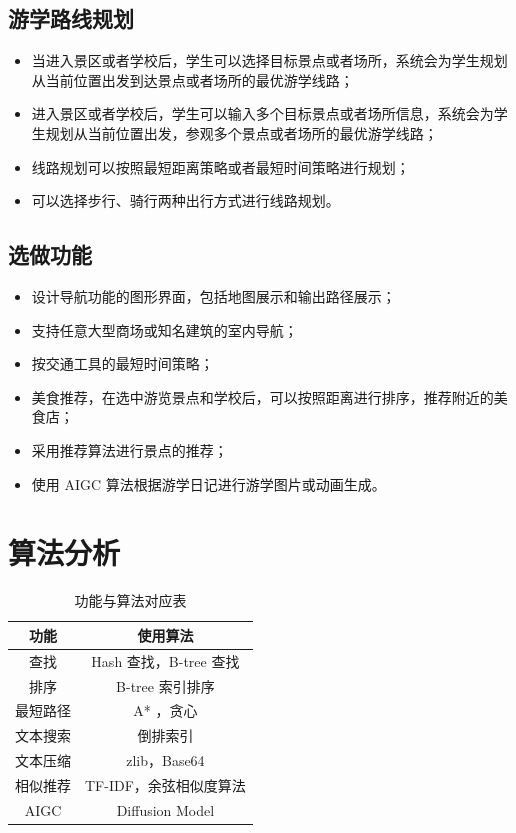 \documentclass{ctexart}
\begin{document}
\subsection{游学路线规划}

\begin{itemize}
    \item 当进入景区或者学校后，学生可以选择目标景点或者场所，系统会为学生规划从当前位置出发到达景点或者场所的最优游学线路；
    \item 进入景区或者学校后，学生可以输入多个目标景点或者场所信息，系统会为学生规划从当前位置出发，参观多个景点或者场所的最优游学线路；
    \item 线路规划可以按照最短距离策略或者最短时间策略进行规划；
    \item 可以选择步行、骑行两种出行方式进行线路规划。
\end{itemize}

\subsection{选做功能}

\begin{itemize}
    \item 设计导航功能的图形界面，包括地图展示和输出路径展示；
    \item 支持任意大型商场或知名建筑的室内导航；
    \item 按交通工具的最短时间策略；
    \item 美食推荐，在选中游览景点和学校后，可以按照距离进行排序，推荐附近的美食店；
    \item 采用推荐算法进行景点的推荐；
    \item 使用 AIGC 算法根据游学日记进行游学图片或动画生成。
\end{itemize}

\section{算法分析}

\begin{table}[htbp]
    \centering
    \caption{功能与算法对应表}
    \label{tab:my-table}
    \begin{tabular}{@{}cc@{}}
        \toprule
        \textbf{功能} & \textbf{使用算法}     \\ \midrule
        查找          & Hash 查找，B-tree 查找 \\
        排序          & B-tree 索引排序       \\
        最短路径        & A* ，贪心            \\
        文本搜索        & 倒排索引              \\
        文本压缩        & zlib，Base64       \\
        相似推荐        & TF-IDF，余弦相似度算法    \\
        AIGC        & Diffusion Model   \\
        \bottomrule
    \end{tabular}
\end{table}
\end{document}
